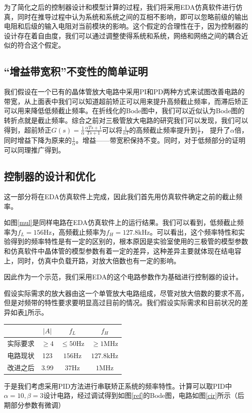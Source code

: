 \documentclass[UTF8,a4paper]{paper}
\begin{document}
为了简化之后的控制器设计和模型计算的过程，我们将采用EDA仿真软件进行仿真，同时在推导过程中认为系统和系统之间的互相不影响，即可以忽略前级的输出电阻和后级的输入电阻对当前模块的影响。这个假定的合理性在于，因为控制器的设计存在着自由度，我们可以通过调整使得系统和系统，网络和网络之间的耦合近似的符合这个假定。

\subsection{“增益带宽积”不变性的简单证明}
我们假设在一个已有的晶体管放大电路中采用PI和PD两种方式来试图改善电路的带宽，从上面表中我们可以知道超前矫正可以用来提升高频截止频率，而滞后矫正可以用来降低低频截止频率。在折线化的Bode图中，我们可以近似认为Bode图的转折点就是截止频率。综合之前对三极管放大电路的研究我们可以发现，我们可以得到，超前矫正$\displaystyle{G(s)=\frac{1}{\alpha}\frac{\alpha Ts+1}{Ts+1}}$可以将$\displaystyle{\frac{1}{\alpha T}}$的高频截止频率提升到$\displaystyle{\frac{1}{T}}$， 提升了$\alpha$倍，同时增益下降为原来的$\displaystyle{\frac{1}{\alpha}}$。增益——带宽积保持不变。同时，对于低频部分的证明可以同理推广得到。

\subsection{控制器的设计和优化}
这一部分将在EDA仿真软件上完成，因此我们首先用仿真软件确定之前的截止频率。

如图\ref{mul}是同样电路在EDA仿真软件上的运行结果。我们可以看到，低频截止频率为$f_L=156\mathrm{Hz}$，高频截止频率为$f_H=127.8\mathrm{kHz}$。可以看出，这个频率特性和实验得到的频率特性是有一定的区别的，根本原因是实验室使用的三极管的模型参数和仿真软件中晶体管的模型参数有着一定的差异，这种差异主要就体现在结电容上，同时，仿真中负载开路，对放大倍数也有一定的影响。

因此作为一个示范，我们采用EDA的这个电路参数作为基础进行控制器的设计。

假设实际需求的放大器由这一个单管放大电路组成，尽管对放大倍数的要求不高，但是对频带的特性要求要明显高过目前的情况。我们假设实际需求和目前状况的差异如表\ref{want}所示。

\begin{table}[b]
\label{want}
\centering
\begin{tabular}{|c|c|c|c|}
\hline
 &$|A|$&$f_L$&$f_H$\\
\hline
实际要求&$\ge4$&$\le50\mathrm{Hz}$&$\ge1\mathrm{MHz}$\\
\hline
电路现状&123&$156\mathrm{Hz}$&$127.8\mathrm{kHz}$\\
\hline
改进之后&3.99&$37\mathrm{Hz}$&$1\mathrm{MHz}$\\
\hline
\end{tabular}
\end{table}
于是我们考虑采用PID方法进行串联矫正系统的频率特性。计算可以取PID中$\alpha = 10,\beta = 3$设计电路，经过调试得到如图\ref{ref}的Bode图，电路如图\ref{cir}所示（后期部分参数有微调）
\end{document}
